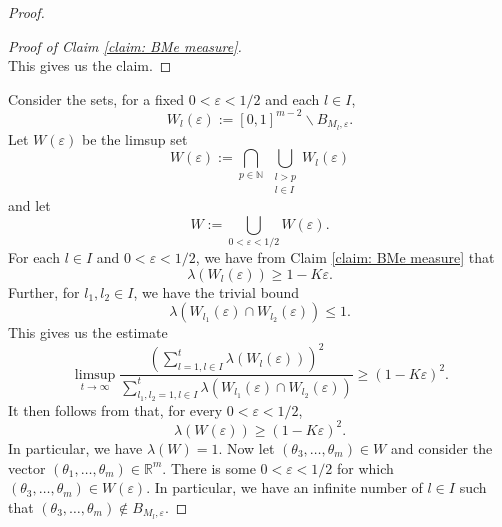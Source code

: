 \documentclass[reqno,11pt, twoside]{amsart}
\theoremstyle{plain}
\theoremstyle{definition}
\theoremstyle{definition}
\theoremstyle{remark}
\numberwithin{equation}{section}
\newcommand{\R}{{\mathbb{R}}}
\newcommand{\N}{{\mathbb{N}}}
\begin{document}
\begin{proof}
\begin{proof}[Proof of Claim \ref{claim: BMe measure}]
\begin{equation*}
      \end{equation*}
This gives us the claim.
\end{proof}
Consider the sets, for a fixed $0 <\varepsilon< 1/2$ and each $l \in I$,
\begin{equation*}
    W_l(\varepsilon) := [0,1]^{m-2} \smallsetminus B_{M_l, \varepsilon}.
\end{equation*}
Let $W(\varepsilon)$ be the limsup set
\begin{equation*}
    W(\varepsilon) := \bigcap_{p \in \N}\ \bigcup_{\substack{l > p\\ l \in I}} W_l(\varepsilon)
\end{equation*}
and let 
\begin{equation*}
    W := \bigcup_{0 < \varepsilon< 1/2} W(\varepsilon).
\end{equation*}
For each $l \in I$ and $0 < \varepsilon < 1/2$, we have from Claim \ref{claim: BMe measure} that
\begin{equation*}
    \lambda (W_l(\varepsilon)) \geq 1 - K \varepsilon.
\end{equation*}
Further, for $l_1, l_2 \in I$, we have the trivial bound
\begin{equation*}
    \lambda(W_{l_1}(\varepsilon) \cap W_{l_2}(\varepsilon)) \leq 1.
\end{equation*}
This gives us the estimate
\begin{equation*}
    \limsup_{t\to \infty} \frac{\left(\sum_{l=1, l \in I}^t \lambda(W_l(\varepsilon))\right)^2}{ \sum_{l_1, l_2 =1, l \in I}^t \lambda(W_{l_1}(\varepsilon) \cap W_{l_2}(\varepsilon))} 
    \geq (1 - K \varepsilon)^2.
\end{equation*}
It then follows from \cite[Theorem 18.10]{Gut} that, for every $0 < \varepsilon < 1/2$,
\begin{equation*}
    \lambda(W(\varepsilon)) \geq (1- K\varepsilon)^2.
\end{equation*}
In particular, we have $\lambda(W) = 1$.
Now let $(\theta_3,\dots, \theta_m) \in W$ and consider the vector $(\theta_1, \dots, \theta_m) \in \R^m$.
There is some $0 < \varepsilon < 1/2$ for which $(\theta_3, \dots, \theta_m) \in W(\varepsilon)$.
In particular, we have an infinite number of $l \in I$ such that $(\theta_3, \dots, \theta_m) \notin B_{M_l, \varepsilon}$.


\end{proof}
\end{document}
